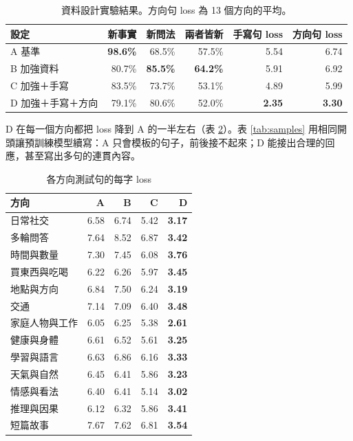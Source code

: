 \documentclass[11pt,a4paper]{article}
\begin{document}
\begin{table}[H]
\centering
\caption{資料設計實驗結果。方向句 loss 為 13 個方向的平均。}\label{tab:best}
\begin{tabular}{lrrrrr}
\toprule
設定 & 新事實 & 新問法 & 兩者皆新 & 手寫句 loss & 方向句 loss \\
\midrule
A 基準 & \textbf{98.6\%} & 68.5\% & 57.5\% & 5.54 & 6.74 \\
B 加強資料 & 80.7\% & \textbf{85.5\%} & \textbf{64.2\%} & 5.91 & 6.92 \\
C 加強＋手寫 & 83.5\% & 73.7\% & 53.1\% & 4.89 & 5.99 \\
D 加強＋手寫＋方向 & 79.1\% & 80.6\% & 52.0\% & \textbf{2.35} & \textbf{3.30} \\
\bottomrule
\end{tabular}
\end{table}

D 在每一個方向都把 loss 降到 A 的一半左右（表 \ref{tab:directions}）。表 \ref{tab:samples} 用相同開頭讓預訓練模型續寫：A 只會模板的句子，前後接不起來；D 能接出合理的回應，甚至寫出多句的連貫內容。

\begin{table}[H]
\centering
\caption{各方向測試句的每字 loss}\label{tab:directions}
\small
\begin{tabular}{lrrrr}
\toprule
方向 & A & B & C & D \\
\midrule
日常社交 & 6.58 & 6.74 & 5.42 & \textbf{3.17} \\
多輪問答 & 7.64 & 8.52 & 6.87 & \textbf{3.42} \\
時間與數量 & 7.30 & 7.45 & 6.08 & \textbf{3.76} \\
買東西與吃喝 & 6.22 & 6.26 & 5.97 & \textbf{3.45} \\
地點與方向 & 6.84 & 7.50 & 6.24 & \textbf{3.19} \\
交通 & 7.14 & 7.09 & 6.40 & \textbf{3.48} \\
家庭人物與工作 & 6.05 & 6.25 & 5.38 & \textbf{2.61} \\
健康與身體 & 6.61 & 6.52 & 5.61 & \textbf{3.25} \\
學習與語言 & 6.63 & 6.86 & 6.16 & \textbf{3.33} \\
天氣與自然 & 6.45 & 6.41 & 5.86 & \textbf{3.23} \\
情感與看法 & 6.40 & 6.41 & 5.14 & \textbf{3.02} \\
推理與因果 & 6.12 & 6.32 & 5.86 & \textbf{3.41} \\
短篇故事 & 7.67 & 7.62 & 6.81 & \textbf{3.54} \\
\bottomrule
\end{tabular}
\end{table}
\end{document}
